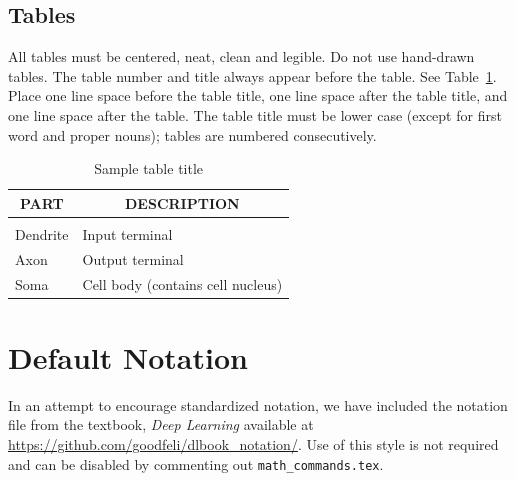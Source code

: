 \documentclass[10pt]{article} %
\begin{document}
\subsection{Tables}

All tables must be centered, neat, clean and legible. Do not use hand-drawn
tables. The table number and title always appear before the table. See
Table~\ref{sample-table}. Place one line space before the table title, one line space after the table
title, and one line space after the table. The table title must be lower case
(except for first word and proper nouns); tables are numbered consecutively.

\begin{table}[t]
\caption{Sample table title}
\label{sample-table}
\begin{center}
\begin{tabular}{ll}
\multicolumn{1}{c}{\bf PART}  &\multicolumn{1}{c}{\bf DESCRIPTION}
\\ \hline \\
Dendrite         &Input terminal \\
Axon             &Output terminal \\
Soma             &Cell body (contains cell nucleus) \\
\end{tabular}
\end{center}
\end{table}

\section{Default Notation}

In an attempt to encourage standardized notation, we have included the
notation file from the textbook, \textit{Deep Learning}
\cite{goodfellow2016deep} available at
\url{https://github.com/goodfeli/dlbook_notation/}.  Use of this style
is not required and can be disabled by commenting out
\texttt{math\_commands.tex}.
\end{document}
